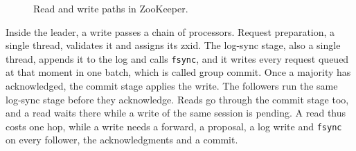 \documentclass{llncs}
\begin{document}
\begin{figure}[t]
  \centering
  \caption{Read and write paths in ZooKeeper.}
  \label{fig:pipeline}
\end{figure}

Inside the leader, a write passes a chain of processors. Request preparation, a single thread, validates it and assigns its zxid. The log-sync stage, also a single thread, appends it to the log and calls \texttt{fsync}, and it writes every request queued at that moment in one batch, which is called group commit. Once a majority has acknowledged, the commit stage applies the write. The followers run the same log-sync stage before they acknowledge. Reads go through the commit stage too, and a read waits there while a write of the same session is pending. A read thus costs one hop, while a write needs a forward, a proposal, a log write and \texttt{fsync} on every follower, the acknowledgments and a commit.
\end{document}
